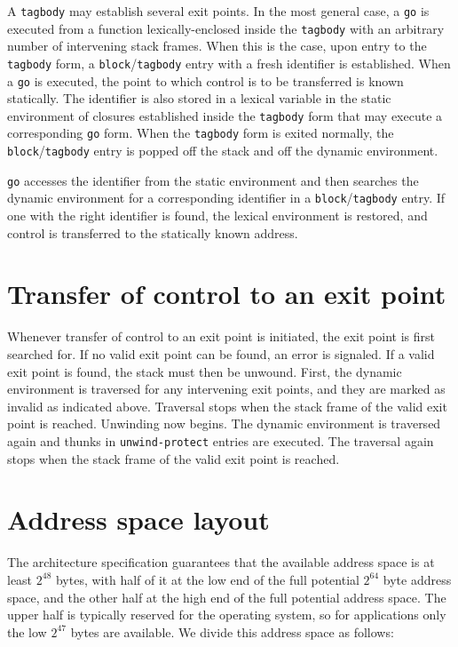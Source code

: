 A \texttt{tagbody} may establish several exit points.  In the most
general case, a \texttt{go} is executed from a function
lexically-enclosed inside the \texttt{tagbody} with an arbitrary
number of intervening stack frames.  When this is the case, upon entry
to the \texttt{tagbody} form, a \texttt{block}/\texttt{tagbody} entry
with a fresh identifier is established.  When a \texttt{go} is
executed, the point to which control is to be transferred is known
statically.  The identifier is also stored in a lexical variable in
the static environment of closures established inside the
\texttt{tagbody} form that may execute a corresponding \texttt{go}
form.  When the \texttt{tagbody} form is exited normally, the
\texttt{block}/\texttt{tagbody} entry is popped off the stack and off
the dynamic environment.

\texttt{go} accesses the identifier from the static environment and
then searches the dynamic environment for a corresponding identifier
in a \texttt{block}/\texttt{tagbody} entry.  If one with the right
identifier is found, the lexical environment is restored, and control
is transferred to the statically known address.

\section{Transfer of control to an exit point}

Whenever transfer of control to an exit point is initiated, the exit
point is first searched for.  If no valid exit point can be found, an
error is signaled.  If a valid exit point is found, the stack must
then be unwound.  First, the dynamic environment is traversed for any
intervening exit points, and they are marked as invalid as indicated
above.  Traversal stops when the stack frame of the valid exit point
is reached.  Unwinding now begins.  The dynamic environment is
traversed again and thunks in \texttt{unwind-protect} entries are
executed.  The traversal again stops when the stack frame of the valid
exit point is reached.

\section{Address space layout}

The architecture specification guarantees that the available address
space is at least $2^{48}$ bytes, with half of it at the low end of
the full potential $2^{64}$ byte address space, and the other half at
the high end of the full potential address space.  The upper half is
typically reserved for the operating system, so for applications only
the low $2^{47}$ bytes are available.  We divide this address space as
follows:

